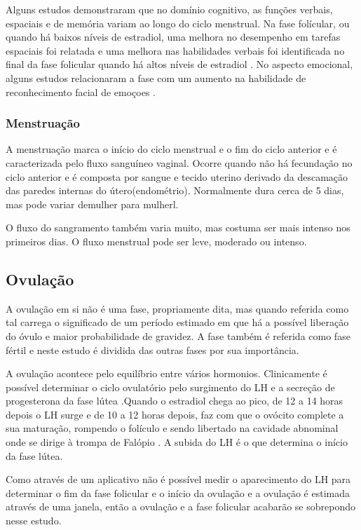 Alguns estudos demonstraram que no domínio cognitivo, as funções verbais, espaciais e de memória variam ao longo do ciclo menstrual. Na fase folícular, ou quando há baixos níveis de estradiol, uma melhora no desempenho em tarefas espaciais foi relatada \cite{hausmann2000} e uma melhora nas habilidades verbais foi identificada no final da fase folicular quando há altos níveis de estradiol \cite{Rosenberg2002}. No aspecto emocional, alguns estudos relacionaram a fase com um aumento na habilidade de reconhecimento facial de emoçoes \cite{derntl2013}.


\subsubsection{Menstruação}

A menstruação marca o início do ciclo menstrual e o fim do ciclo anterior e é caracterizada pelo fluxo sanguíneo vaginal. Ocorre quando não há fecundação no ciclo anterior e é composta por sangue e tecido uterino derivado da descamação das paredes internas do útero(endométrio). Normalmente dura cerca de 5 dias, mas pode variar demulher para mulherl\cite{guyton2012}.

O fluxo do sangramento também varia muito, mas costuma ser mais intenso nos primeiros dias. O fluxo menstrual pode ser leve, moderado ou intenso.

\subsection{Ovulação}

A ovulação em si não é uma fase, propriamente dita, mas quando referida como tal carrega o significado de um período estimado em que há a possível liberação do óvulo e maior probabilidade de gravidez. A fase também é referida como fase fértil e neste estudo é dividida das outras fases por sua importância.

A ovulação acontece pelo equilíbrio entre vários hormonios. Clinicamente é possível determinar o ciclo ovulatório pelo surgimento do LH e a secreção de progesterona da fase lútea \cite{fritz2010}.Quando o estradiol chega ao pico, de 12 a 14 horas depois o LH surge e de 10 a 12 horas depois, faz com que o ovócito complete a sua maturação, rompendo o folículo e sendo libertado na cavidade abnominal onde se dirige à trompa de Falópio \cite{fritz2010}. A subida do LH é o que determina o início da fase lútea.

Como através de um aplicativo não é possível medir o aparecimento do LH para determinar o fim da fase folicular e o início da ovulação e a ovulação é estimada através de uma janela, então a ovulação e a fase folicular acabarão se sobrepondo nesse estudo.

